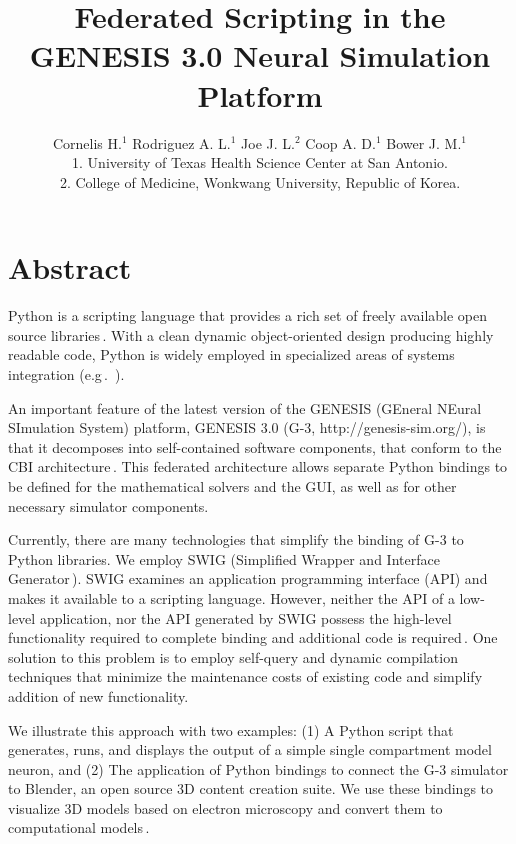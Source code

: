\documentclass[12pt]{article}
\begin{document}
\title{Federated Scripting in the GENESIS 3.0 Neural Simulation
  Platform}

\author{Cornelis H.$^1$ Rodriguez A. L.$^1$ Joe J. L.$^2$ Coop A. D.$^1$ Bower J. M.$^1$\\
  {\small 1. University of Texas Health Science Center at San Antonio.} \\
  {\small 2. College of Medicine, Wonkwang University, Republic of Korea.}
}

\maketitle
{}
\newpage
\section*{Abstract}
Python is a scripting language that provides a rich set of freely
available open source
libraries\,\cite{langtangen04:_python_scrip_comput_scien}. With a
clean dynamic object-oriented design producing highly readable code,
Python is widely employed in specialized areas of systems integration
(e.g\,.~\cite{thiruvathukal01:_web_progr_python}).

An important feature of the latest version of the GENESIS (GEneral
NEural SImulation System) platform, GENESIS 3.0 (G-3, http://genesis-sim.org/), is that it
decomposes into self-contained software components, that conform to the
CBI architecture\,\cite{cornelis08:_cbi_archit_comput_simul_realis}.
This federated architecture allows separate Python bindings to be
defined for the mathematical solvers and the GUI, as well as for other
necessary simulator components.

Currently, there are many technologies that simplify the binding of G-3
to Python libraries.  We employ SWIG (Simplified Wrapper and Interface
Generator\,\cite{08:_simpl_wrapp_inter_gener}).  SWIG examines an
application programming interface (API) and makes it available to a scripting language.
However, neither the API of a low-level application, nor the API
generated by SWIG possess the high-level functionality required to
complete binding and additional code is
required\,\cite{08:_swig_python}. One solution to this problem is to employ self-query and dynamic
compilation techniques that minimize the maintenance costs of existing code
and simplify addition of new functionality.

We illustrate this approach with two examples: (1) A Python script that
generates, runs, and displays the output of a simple single
compartment model neuron, and (2) The application of Python bindings
to connect the G-3 simulator to Blender, an open source 3D content
creation suite.  We use these bindings to visualize 3D models based on
electron microscopy and convert them to computational
models\,\cite{cornelis08:_model_neuros_genes}.
\end{document}
